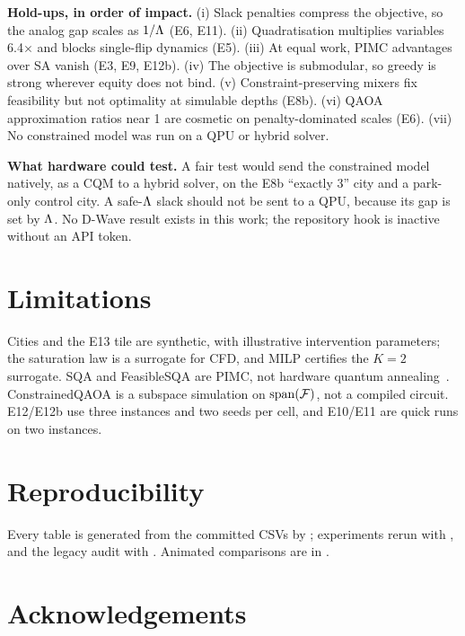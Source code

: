 \documentclass[conference]{IEEEtran}
\begin{document}
\textbf{Hold-ups, in order of impact.} (i) Slack penalties compress the objective, so the
analog gap scales as $1/\Lambda$ (E6, E11). (ii) Quadratisation multiplies variables 6.4$\times$ and
blocks single-flip dynamics (E5). (iii) At equal work, PIMC advantages over SA vanish (E3, E9,
E12b). (iv) The objective is submodular, so greedy is strong wherever equity does not bind.
(v) Constraint-preserving mixers fix feasibility but not optimality at simulable depths (E8b).
(vi) QAOA approximation ratios near 1 are cosmetic on penalty-dominated scales (E6). (vii) No
constrained model was run on a QPU or hybrid solver.

\textbf{What hardware could test.} A fair test would send the constrained model natively, as a CQM
to a hybrid solver, on the E8b ``exactly 3'' city and a park-only control city. A safe-$\Lambda$ slack
\QUBO{} should not be sent to a QPU, because its gap is set by $\Lambda$. No D-Wave result exists in
this work; the repository hook is inactive without an API token.

\section{Limitations}\label{sec:limitations}
Cities and the E13 tile are synthetic, with illustrative intervention parameters; the saturation law
is a surrogate for CFD, and MILP certifies the $K{=}2$ surrogate. SQA and FeasibleSQA are PIMC, not
hardware quantum annealing~\cite{heim2015}. ConstrainedQAOA is a subspace simulation on
$\mathrm{span}(\mathcal{F})$, not a compiled circuit. E12/E12b use three instances and two seeds per cell,
and E10/E11 are quick runs on two instances.

\section*{Reproducibility}
Every table is generated from the committed CSVs by ;
experiments rerun with , and the legacy audit
with . Animated comparisons are in .

\section*{Acknowledgements}


\clearpage


\end{document}
